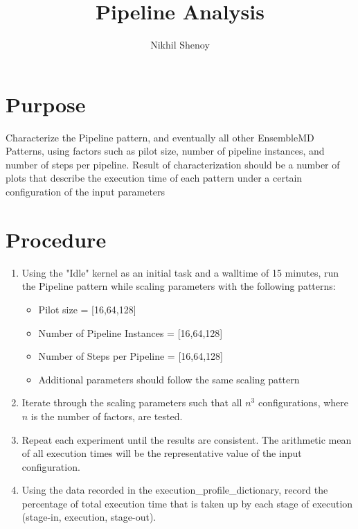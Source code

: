 \documentclass{article}
\title{Pipeline Analysis}
\author{Nikhil Shenoy}
\begin{document}
	\maketitle
	\newpage

	\section*{Purpose} %
	
	Characterize the Pipeline pattern, and eventually all other EnsembleMD Patterns, using factors such as pilot size, number of pipeline instances, and number of steps per pipeline. Result of characterization should be a number of plots that describe the execution time of each pattern under a certain configuration of the input parameters
	
	\section*{Procedure}
	\begin{enumerate}
		\item Using the "Idle" kernel as an initial task and a walltime of 15 minutes, run the Pipeline pattern while scaling parameters with the following patterns:

		\begin{itemize}
			\item Pilot size = [16,64,128]
			\item Number of Pipeline Instances = [16,64,128]
			\item Number of Steps per Pipeline = [16,64,128]
			\item Additional parameters should follow the same scaling pattern
		\end{itemize}
		
		\item Iterate through the scaling parameters such that all \(n^3\) configurations, where \(n\) is the number of factors, are tested.
		\item Repeat each experiment until the results are consistent. The arithmetic mean of all execution times will be the representative value of the input configuration.
		\item Using the data recorded in the execution\_profile\_dictionary, record the percentage of total execution time that is taken up by each stage of execution (stage-in, execution, stage-out).

	\end{enumerate}
\end{document}
